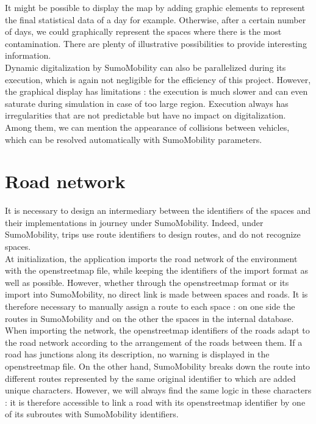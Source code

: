 It might be possible to display the map by adding graphic elements to represent the final statistical data of a day for example. Otherwise, after a certain number of days, we could graphically represent the spaces where there is the most contamination. There are plenty of illustrative possibilities to provide interesting information.\\

Dynamic digitalization by SumoMobility can also be parallelized during its execution, which is again not negligible for the efficiency of this project. However, the graphical display has limitations : the execution is much slower and can even saturate during simulation in case of too large region. Execution always has irregularities that are not predictable but have no impact on digitalization. Among them, we can mention the appearance of collisions between vehicles, which can be resolved automatically with SumoMobility parameters.\\

\pagebreak

\section{Road network}

It is necessary to design an intermediary between the identifiers of the spaces and their implementations in journey under SumoMobility. Indeed, under SumoMobility, trips use route identifiers to design routes, and do not recognize spaces.\\

At initialization, the application imports the road network of the environment with the openstreetmap file, while keeping the identifiers of the import format as well as possible. However, whether through the openstreetmap format or its import into SumoMobility, no direct link is made between spaces and roads. It is therefore necessary to manually assign a route to each space : on one side the routes in SumoMobility and on the other the spaces in the internal database. When importing the network, the openstreetmap identifiers of the roads adapt to the road network according to the arrangement of the roads between them. If a road has junctions along its description, no warning is displayed in the openstreetmap file. On the other hand, SumoMobility breaks down the route into different routes represented by the same original identifier to which are added unique characters. However, we will always find the same logic in these characters : it is therefore accessible to link a road with its openstreetmap identifier by one of its subroutes with SumoMobility identifiers.\\

